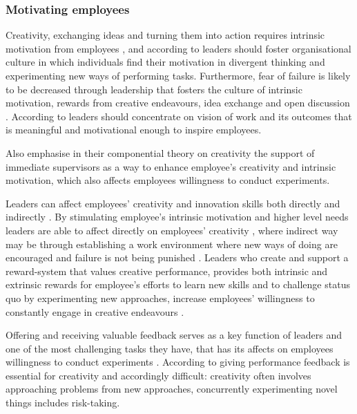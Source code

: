 \subsubsection*{Motivating employees}
Creativity, exchanging ideas and turning them into action requires intrinsic motivation from employees \citep{jung2001transformational}, and according to \citet{amabile1998kill} leaders should foster organisational culture in which individuals find their motivation in divergent thinking and experimenting new ways of performing tasks. Furthermore, fear of failure is likely to be decreased through leadership that fosters the culture of intrinsic motivation, rewards from creative endeavours, idea exchange and open discussion \citet{amabile1998kill}. According to \citet{sosik1999leadership} leaders should concentrate on vision of work and its outcomes that is meaningful and motivational enough to inspire employees.

Also \citet{amabile2004leader} emphasise in their componential theory on creativity the support of immediate supervisors as a way to enhance employee's creativity and intrinsic motivation, which also affects employees willingness to conduct experiments. 

Leaders can affect employees' creativity and innovation skills both directly and indirectly \citep{jung2003role}. By stimulating employee's intrinsic motivation and higher level needs leaders are able to affect directly on employees' creativity \citep{tierney1999examination}, where indirect way may be through establishing a work environment where new ways of doing are encouraged and failure is not being punished \citep{amabile1996assessing}. Leaders who create and support a reward-system that values creative performance, provides both intrinsic and extrinsic rewards for employee's efforts to learn new skills and to challenge status quo by experimenting new approaches, increase employees' willingness to constantly engage in creative endeavours \citep{jung2001transformational,mumford1988creativity}.

Offering and receiving valuable feedback serves as a key function of leaders and one of the most challenging tasks they have, that has its affects on employees willingness to conduct experiments \citep{amabile2004leader,amabile1998kill}. According to \citet{shalley2004leaders} giving performance feedback is essential for creativity and accordingly difficult: creativity often involves approaching problems from new approaches, concurrently experimenting novel things includes risk-taking. 

